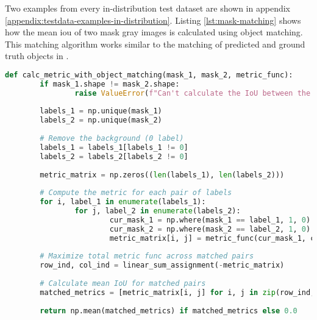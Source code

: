 		Two examples from every in-distribution test dataset are shown in appendix \ref{appendix:testdata-examples-in-distribution}.
		\clearpage
		Listing \ref{lst:mask-matching} shows how the mean \ac{iou} of two mask gray images is calculated using object matching. This matching algorithm works similar to the matching of predicted and ground truth objects in \cite{Xiang2021}.
		
		\begin{lstlisting}[language=Python,caption=Calculate the mean \acl{iou} between two mask images using mask matching, label=lst:mask-matching]
def calc_metric_with_object_matching(mask_1, mask_2, metric_func):
		if mask_1.shape != mask_2.shape:
				raise ValueError(f"Can't calculate the IoU between the 2 masks because of different shapes: {mask_1.shape} and {mask_2.shape}")
		
		labels_1 = np.unique(mask_1)
		labels_2 = np.unique(mask_2)
		
		# Remove the background (0 label)
		labels_1 = labels_1[labels_1 != 0]
		labels_2 = labels_2[labels_2 != 0]
		
		metric_matrix = np.zeros((len(labels_1), len(labels_2)))
		
		# Compute the metric for each pair of labels
		for i, label_1 in enumerate(labels_1):
				for j, label_2 in enumerate(labels_2):
						cur_mask_1 = np.where(mask_1 == label_1, 1, 0)
						cur_mask_2 = np.where(mask_2 == label_2, 1, 0)
						metric_matrix[i, j] = metric_func(cur_mask_1, cur_mask_2)
		
		# Maximize total metric func across matched pairs
		row_ind, col_ind = linear_sum_assignment(-metric_matrix)
		
		# Calculate mean IoU for matched pairs
		matched_metrics = [metric_matrix[i, j] for i, j in zip(row_ind, 
																																	col_ind)]
		return np.mean(matched_metrics) if matched_metrics else 0.0
		\end{lstlisting}
		
		
	
	
	\clearpage
